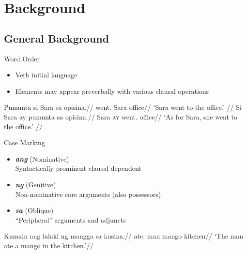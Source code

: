 \documentclass[pdf]{beamer}
\newcommand{\g}[1]{\textsc{#1}}
\newcommand{\texthl}[1]{\textcolor{cyan!75!blue}{\textbf{#1}}}
\begin{document}
\section{Background}

\subsection{General Background}

\begin{frame}{Word Order}
  \begin{itemize}
    \item Verb initial language
    \item Elements may appear preverbally with various clausal operations
  \end{itemize}
  \ex\begingl
    \gla  Pumunta si Sara sa opisina.//
    \glb  went.\Av{} \Nom{} Sara \Obl{} office//
    \glft `Sara went to the office.'
          //
  \endgl
  \xe
  \ex\begingl
    \gla  Si Sara ay pumunta sa opisina.//
    \glb  \Nom{} Sara \g{ay} went.\Av{} \Obl{} office//
    \glft `As for Sara, she went to the office.'
          //
  \endgl
  \xe
\end{frame}

\begin{frame}{Case Marking}
\begin{itemize}
  \item \texthl{\textit{ang}} (Nominative)\\
    Syntactically prominent clausal dependent
  \item \texthl{\textit{ng}} (Genitive)\\
    Non-nominative core arguments (also possessors)
  \item \texthl{\textit{sa}} (Oblique)\\
    ``Peripheral'' arguments and adjuncts
\end{itemize}

\ex\begingl
  \gla  Kumain ang lalaki ng mangga sa kusina.//
  \glb  ate.\Av{} \Nom{} man \Gen{} mango \Obl{} kitchen//
  \glft `The man ate a mango in the kitchen.'//
\endgl
\xe
\end{frame}
\end{document}
